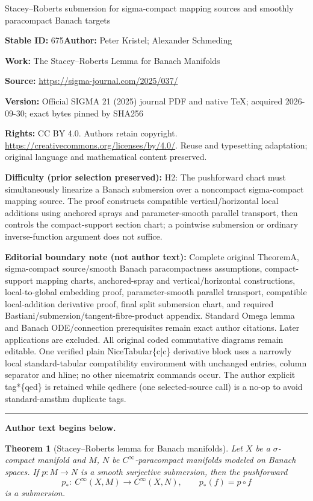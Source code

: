 \documentclass[11pt]{article}
\numberwithin{equation}{section}
\numberwithin{equation}{section}
\newtheorem{theoremA}{Theorem}
\begin{document}
\begin{center}\Large Stacey–Roberts submersion for sigma-compact mapping sources and smoothly paracompact Banach targets\end{center}
\noindent\textbf{Stable ID:} 675\quad\textbf{Author:} Peter Kristel; Alexander Schmeding\par
\noindent\textbf{Work:} The Stacey–Roberts Lemma for Banach Manifolds\par
\noindent\textbf{Source:} \url{https://sigma-journal.com/2025/037/}\par
\noindent\textbf{Version:} Official SIGMA 21 (2025) journal PDF and native TeX; acquired 2026-09-30; exact bytes pinned by SHA256\par
\noindent\textbf{Rights:} CC BY 4.0. Authors retain copyright. \url{https://creativecommons.org/licenses/by/4.0/}. Reuse and typesetting adaptation; original language and mathematical content preserved.\par
\noindent\textbf{Difficulty (prior selection preserved):} {\CJKfont H2: The pushforward chart must simultaneously linearize a Banach submersion over a noncompact sigma-compact mapping source. The proof constructs compatible vertical/horizontal local additions using anchored sprays and parameter-smooth parallel transport, then controls the compact-support section chart; a pointwise submersion or ordinary inverse-function argument does not suffice.}\par
\medskip\noindent\textbf{Editorial boundary note (not author text):} Complete original TheoremA, sigma-compact source/smooth Banach paracompactness assumptions, compact-support mapping charts, anchored-spray and vertical/horizontal constructions, local-to-global embedding proof, parameter-smooth parallel transport, compatible local-addition derivative proof, final split submersion chart, and required Bastiani/submersion/tangent-fibre-product appendix. Standard Omega lemma and Banach ODE/connection prerequisites remain exact author citations. Later applications are excluded. All original coded commutative diagrams remain editable. One verified plain NiceTabular\{c|c\} derivative block uses a narrowly local standard-tabular compatibility environment with unchanged entries, column separator and hline; no other nicematrix commands occur. The author explicit tag*\{qed\} is retained while qedhere (one selected-source call) is a no-op to avoid standard-amsthm duplicate tags.\par
\medskip\hrule\medskip\noindent\textbf{Author text begins below.}\par
\setcounter{section}{1}
\begin{theoremA}[Stacey--Roberts lemma for Banach manifolds] \label{TheoremA}
Let $X$ be a $\sigma$-compact manifold and $M$, $N$ be $C^\infty$-paracompact manifolds modeled on Banach spaces.
If $p \colon M \rightarrow N$ is a smooth surjective submersion, then the pushforward
\begin{displaymath} p_\ast \colon\ C^\infty (X,M) \rightarrow C^\infty (X,N),\qquad p_\ast (f)=p\circ f\end{displaymath}
 is a submersion.
\end{theoremA}
\end{document}
